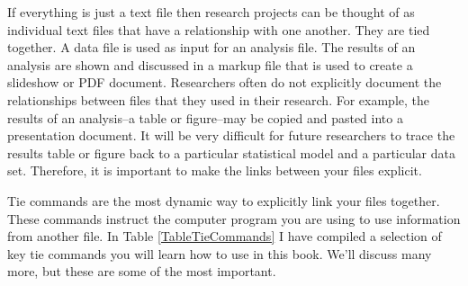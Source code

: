 {If everything is just a text file then research projects can be thought of as individual text files that have a relationship with one another. They are tied together. A data file is used as input for an analysis file. The results of an analysis are shown and discussed in a markup file that is used to create a slideshow or PDF document. Researchers often do not explicitly document the relationships between files that they used in their research. For example, the results of an analysis--a table or figure--may be copied and pasted into a presentation document. It will be very difficult for future researchers to trace the results table or figure back to a particular statistical model and a particular data set. Therefore, it is important to make the links between your files explicit. 

Tie commands are the most dynamic way to explicitly link your files together. These commands instruct the computer program you are using to use information from another file. In Table \ref{TableTieCommands} I have compiled a selection of key tie commands you will learn how to use in this book. We'll discuss many more, but these are some of the most important.

}
